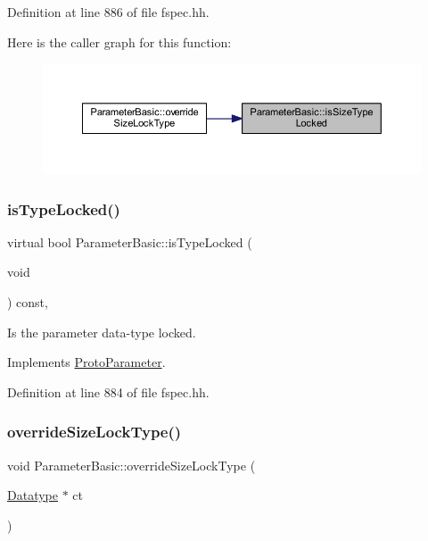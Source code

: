 Definition at line 886 of file fspec.\+hh.

Here is the caller graph for this function\+:
\nopagebreak
\begin{figure}[H]
\begin{center}
\leavevmode
\includegraphics[width=350pt]{class_parameter_basic_ab8644a632a02193f26e4499bbfa7dbc9_icgraph}
\end{center}
\end{figure}
\mbox{\label{class_parameter_basic_a837bdcd23e9bdfad0b8ba0b6b78b9752}} 
\subsubsection{\texorpdfstring{isTypeLocked()}{isTypeLocked()}}
{\footnotesize\ttfamily virtual bool Parameter\+Basic\+::is\+Type\+Locked (\begin{DoxyParamCaption}\item[{void}]{ }\end{DoxyParamCaption}) const\hspace{0.3cm}{\ttfamily [inline]}, {\ttfamily [virtual]}}



Is the parameter data-\/type locked. 



Implements \mbox{\hyperlink{class_proto_parameter_a155b564b34ae0b36d39d5a1caf5d0014}{Proto\+Parameter}}.



Definition at line 884 of file fspec.\+hh.

\mbox{\label{class_parameter_basic_a1653c7aaf1e1883127707f4e25d7d564}} 
\subsubsection{\texorpdfstring{overrideSizeLockType()}{overrideSizeLockType()}}
{\footnotesize\ttfamily void Parameter\+Basic\+::override\+Size\+Lock\+Type (\begin{DoxyParamCaption}\item[{\mbox{\hyperlink{class_datatype}{Datatype}} $\ast$}]{ct }\end{DoxyParamCaption})\hspace{0.3cm}{\ttfamily [virtual]}}



